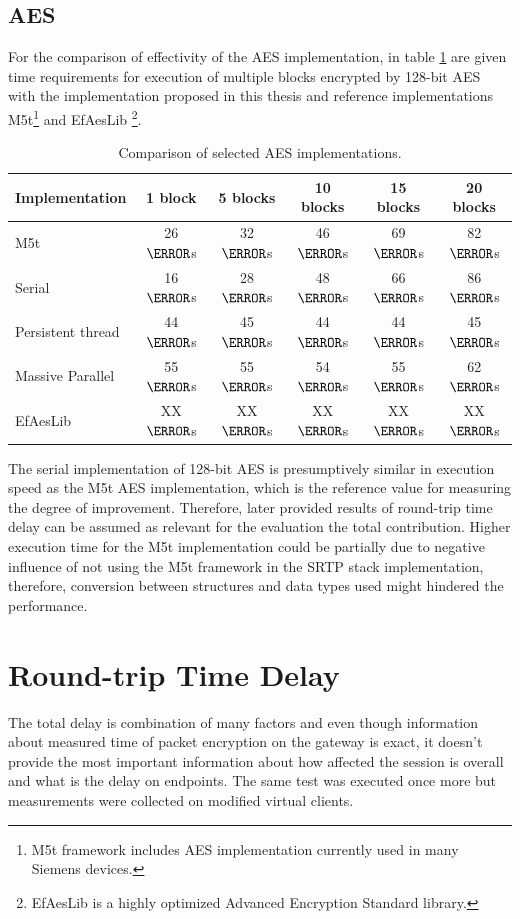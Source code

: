 \subsection*{AES}
For the comparison of effectivity of the AES implementation, in table 
\ref{aes-comparison} are given time requirements for execution of multiple
blocks encrypted by 128-bit AES with the implementation proposed in this thesis
and reference implementations M5t\footnote{ M5t framework includes AES 
implementation currently used in many Siemens devices\cite{m5t}.} and EfAesLib 
\footnote{ EfAesLib is a highly optimized Advanced Encryption Standard 
library\cite{aes-lib}.}.
\begin{table}[H]
\begin{center}
\begin{tabular}{|l|ccccc|}\hline%
Implementation &  1 block & 5 blocks & 10 blocks & 15 blocks & 20 blocks\\\hline
M5t  &26 $\micro$s&32 $\micro$s&46 $\micro$s&69 $\micro$s&82 $\micro$s\\ 
Serial  &16 $\micro$s&28 $\micro$s&48 $\micro$s&66 $\micro$s&86 $\micro$s\\
Persistent thread&44 $\micro$s&45 $\micro$s&44 $\micro$s&44 $\micro$s&45 $\micro$s\\
Massive Parallel&55 $\micro$s&55 $\micro$s&54 $\micro$s&55 $\micro$s&62 $\micro$s\\
EfAesLib &XX $\micro$s&XX $\micro$s&XX $\micro$s&XX $\micro$s&XX $\micro$s\\\hline
\end{tabular}
\end{center}
\caption{Comparison of selected AES implementations.}
\label{aes-comparison}
\end{table}

The serial implementation of 128-bit AES is presumptively similar in execution 
speed as the M5t AES implementation, which is the reference value for measuring
the degree of improvement. Therefore, later provided results of round-trip time
delay can be assumed as relevant for the evaluation the total contribution. 
Higher execution time for the M5t implementation could be partially due to
negative influence of not using the M5t framework in the SRTP stack 
implementation, therefore, conversion between structures and data types used
might hindered the performance. 
 

\section{Round-trip Time Delay}
The total delay is combination of many factors and even though information
about measured time of packet encryption on the gateway is exact, it doesn't
provide the most important information about how affected the session is overall
and what is the delay on endpoints. The same test was executed once more but
measurements were collected on modified virtual clients.

